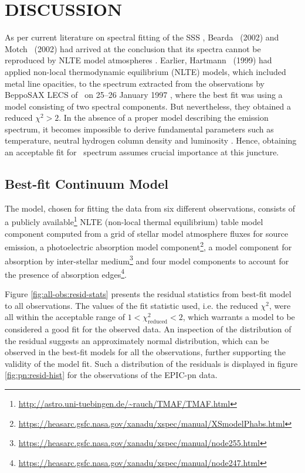     \section{\MakeUppercase{Discussion}} \label{multi-obs:discussion}
    	As per current literature on spectral fitting of the SSS \source, Bearda \etal\ (2002) and Motch \etal\ (2002) had arrived at the conclusion that its spectra cannot be reproduced by NLTE model atmospheres \cite{beardaChandra2002AA,motchXmmNewton2002AA}. Earlier, Hartmann \etal\ (1999) had applied non-local thermodynamic equilibrium (NLTE) models, which included metal line opacities, to the spectrum extracted from the observations by BeppoSAX LECS of \source\ on 25--26 January 1997 \cite{hartmann1999constraining}, where the best fit was using a model consisting of two spectral components. But nevertheless, they obtained a reduced $\chi^2>2$. In the absence of a proper model describing the emission spectrum, it becomes impossible to
derive fundamental parameters such as temperature, neutral hydrogen column density and luminosity \cite{motchXmmNewton2002AA}. Hence, obtaining an acceptable fit for \source\ spectrum assumes crucial importance at this juncture.
    
    	\subsection{Best-fit Continuum Model} \label{multi-obs:discussion:cont-mod}
    		The model, chosen for fitting the data from six different observations, consists of a publicly available\footnote{\url{http://astro.uni-tuebingen.de/~rauch/TMAF/TMAF.html}} NLTE (non-local thermal equilibrium) table model component computed from a grid of stellar model atmosphere fluxes for source emission, a photoelectric absorption model component\footnote{\url{https://heasarc.gsfc.nasa.gov/xanadu/xspec/manual/XSmodelPhabs.html}}, a model component for absorption by inter-stellar medium\footnote{\url{https://heasarc.gsfc.nasa.gov/xanadu/xspec/manual/node255.html}} and four model components to account for the presence of absorption edges\footnote{\url{https://heasarc.gsfc.nasa.gov/xanadu/xspec/manual/node247.html}}.
    		
    		Figure \ref{fig:all-obs:resid-stats} presents the residual statistics from best-fit model to all observations. The values of the fit statistic used, i.e. the reduced $\chi^2$, were all within the acceptable range of $1<\chi^2_\text{reduced}<2$, which warrants a model to be considered a good fit for the observed data. An inspection of the distribution of the residual suggests an approximately normal distribution, which can be observed in the best-fit models for all the observations, further supporting the validity of the model fit. Such a distribution of the residuals is displayed in figure \ref{fig:pn:resid-hist} for the observations of the EPIC-pn data.
    		
